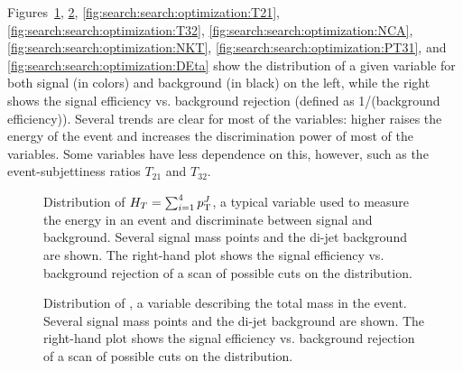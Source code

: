 Figures~\ref{fig:search:search:optimization:HT}, \ref{fig:search:search:optimization:MJ}, \ref{fig:search:search:optimization:T21}, \ref{fig:search:search:optimization:T32}, \ref{fig:search:search:optimization:NCA}, \ref{fig:search:search:optimization:NKT}, \ref{fig:search:search:optimization:PT31}, and \ref{fig:search:search:optimization:DEta} show the distribution of a given variable for both signal (in colors) and background (in black) on the left, while the right shows the signal efficiency vs. background rejection (defined as 1/(background efficiency)). Several trends are clear for most of the variables: higher \mgluino raises the energy of the event and increases the discrimination power of most of the variables. Some variables have less dependence on this, however, such as the event-subjettiness ratios $T_{21}$ and $T_{32}$.


\begin{figure}
\centering
{}
\label{fig:search:search:optimization:HT}
\caption{Distribution of $H_T = \sum_{i=1}^4 p_{\text{T}}^J$, a typical variable used to measure the energy in an event and discriminate between signal and background. Several signal mass points and the \herwigpp di-jet background are shown. The right-hand plot shows the signal efficiency vs. background rejection of a scan of possible cuts on the \HT distribution.}
\end{figure}




\begin{figure}
\centering
{}
\label{fig:search:search:optimization:MJ}
\caption{Distribution of \MJ, a variable describing the total mass in the event. Several signal mass points and the \herwigpp di-jet background are shown. The right-hand plot shows the signal efficiency vs. background rejection of a scan of possible cuts on the \MJ distribution.}
\end{figure}

